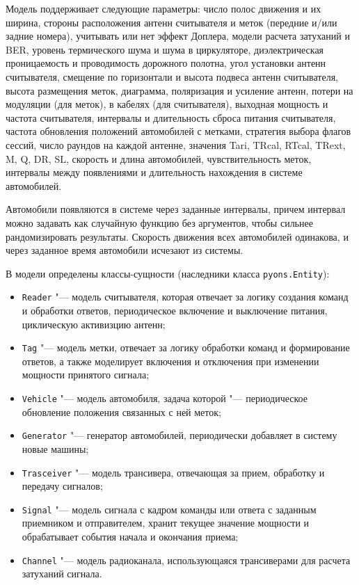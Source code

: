 Модель поддерживает следующие параметры: число полос движения и их ширина, стороны расположения антенн считывателя и меток (передние и/или задние номера), учитывать или нет эффект Доплера, модели расчета затуханий и BER, уровень термического шума и шума в циркуляторе, диэлектрическая проницаемость и проводимость дорожного полотна, угол установки антенн считывателя, смещение по горизонтали и высота подвеса антенн считывателя, высота размещения меток, диаграмма, поляризация и усиление антенн, потери на модуляции (для меток), в кабелях (для считывателя), выходная мощность и частота считывателя, интервалы и длительность сброса питания считывателя, частота обновления положений автомобилей с метками, стратегия выбора флагов сессий, число раундов на каждой антенне, значения Tari, TRcal, RTcal, TRext, M, Q, DR, SL, скорость и длина автомобилей, чувствительность меток, интервалы между появлениями и длительность нахождения в системе автомобилей.

Автомобили появляются в системе через заданные интервалы, причем интервал можно задавать как случайную функцию без аргументов, чтобы сильнее рандомизировать результаты. Скорость движения всех автомобилей одинакова, и через заданное время автомобили исчезают из системы.


В модели определены классы-сущности (наследники класса \texttt{pyons.Entity}):

\begin{itemize}
	\item \texttt{Reader} "--- модель считывателя, которая отвечает за логику создания команд и обработки ответов, периодическое включение и выключение питания, циклическую активизцию антенн;
	\item \texttt{Tag} "--- модель метки, отвечает за логику обработки команд и формирование ответов, а также моделирует включения и отключения при изменении мощности принятого сигнала;
	\item \texttt{Vehicle} "--- модель автомобиля, задача которой "--- периодическое обновление положения связанных с ней меток;
	\item \texttt{Generator} "--- генератор автомобилей, периодически добавляет в систему новые машины;
	\item \texttt{Trasceiver} "--- модель трансивера, отвечающая за прием, обработку и передачу сигналов;
	\item \texttt{Signal} "--- модель сигнала с кадром команды или ответа с заданным приемником и отправителем, хранит текущее значение мощности и обрабатывает события начала и окончания приема;
	\item \texttt{Channel} "--- модель радиоканала, использующаяся трансиверами для расчета затуханий сигнала.
\end{itemize}

